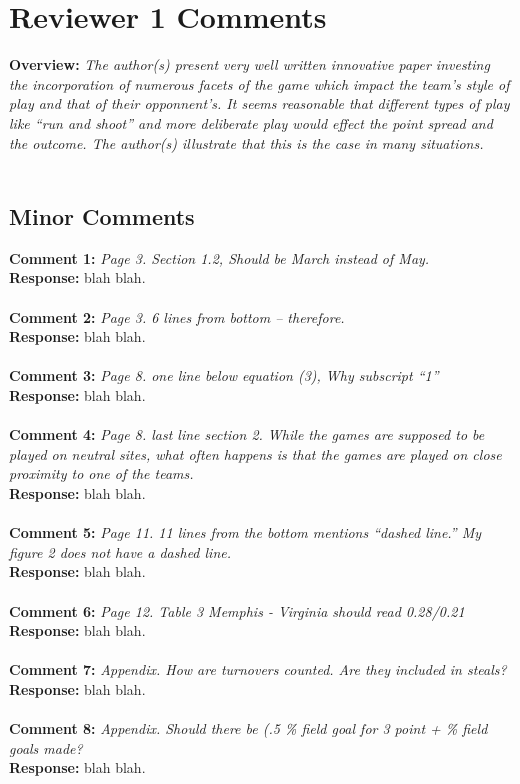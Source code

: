 \documentclass[11pt]{article} %
\begin{document}
\newpage

\section*{Reviewer 1 Comments}
{\bf Overview:} \emph{The author(s) present very well written innovative paper investing the incorporation of numerous facets of the game which impact the team's style of play and that of their opponnent's. It seems reasonable that different types of play like ``run and shoot'' and more deliberate play would effect the point spread and the outcome. The author(s) illustrate that this is the case in many situations.}\\
\\
\subsection*{Minor Comments}
{\bf Comment 1:} \emph{Page 3. Section 1.2, Should be March instead of May.}\\
{\bf Response:} blah blah.\\
\\
{\bf Comment 2:} \emph{Page 3. 6 lines from bottom -- therefore.}\\
{\bf Response:} blah blah.\\
\\
{\bf Comment 3:} \emph{Page 8. one line below equation (3), Why subscript ``1''}\\
{\bf Response:} blah blah.\\
\\
{\bf Comment 4:} \emph{Page 8. last line section 2. While the games are supposed to be played on neutral sites, what often happens is that the games are played on close proximity to one of the teams.}\\
{\bf Response:} blah blah.\\
\\
{\bf Comment 5:} \emph{Page 11. 11 lines from the bottom mentions ``dashed line.'' My figure 2 does not have a dashed line.}\\
{\bf Response:} blah blah.\\
\\
{\bf Comment 6:} \emph{Page 12. Table 3 Memphis - Virginia should read 0.28/0.21}\\
{\bf Response:} blah blah.\\
\\
{\bf Comment 7:} \emph{Appendix. How are turnovers counted. Are they included in steals? }\\
{\bf Response:} blah blah.\\
\\
{\bf Comment 8:} \emph{Appendix. Should there be (.5 \% field goal for 3 point + \% field goals made?}\\
{\bf Response:} blah blah.\\
 \newpage
\end{document}
